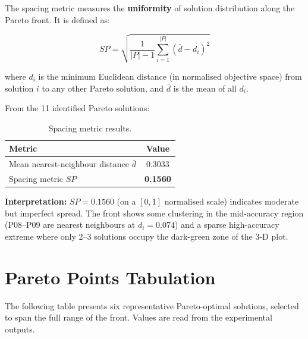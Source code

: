 \documentclass[12pt,a4paper]{article}
\begin{document}
The spacing metric measures the \textbf{uniformity} of solution distribution along the Pareto front. It is defined as:

\begin{equation}
    SP = \sqrt{\frac{1}{|P|-1} \sum_{i=1}^{|P|} \left(\bar{d} - d_i\right)^2}
\end{equation}

where $d_i$ is the minimum Euclidean distance (in normalised objective space) from solution $i$ to any other Pareto solution, and $\bar{d}$ is the mean of all $d_i$.

From the 11 identified Pareto solutions:

\begin{table}[H]
\centering
\begin{tabular}{lc}
\toprule
\textbf{Metric} & \textbf{Value} \\
\midrule
Mean nearest-neighbour distance $\bar{d}$ & 0.3033 \\
Spacing metric $SP$                        & \textbf{0.1560} \\
\bottomrule
\end{tabular}
\caption{Spacing metric results.}
\end{table}

\noindent\textbf{Interpretation:} $SP = 0.1560$ (on a $[0,1]$ normalised scale) indicates moderate but imperfect spread. The front shows some clustering in the mid-accuracy region (P08--P09 are nearest neighbours at $d_i = 0.074$) and a sparse high-accuracy extreme where only 2--3 solutions occupy the dark-green zone of the 3-D plot.

\section{Pareto Points Tabulation}

The following table presents six representative Pareto-optimal solutions, selected to span the full range of the front. Values are read from the experimental outputs.
\end{document}

